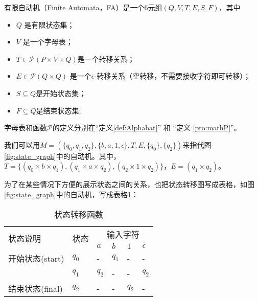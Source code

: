 \begin{definition}
    有限自动机（Finite Automata，FA）是一个6元组$(Q,V,T,E,S,F)$，其中
    \begin{itemize}
        \item $Q$ 是有限状态集；
        \item $V$ 是一个字母表；
        \item $ T \in \mathcal{P}(P\times V \times Q) $是一个转移关系；
        \item $ E \in \mathcal{P}(Q\times Q)$ 是一个$\epsilon$-转移关系（空转移，不需要接收字符即可转移）；
        \item $ S \subseteq Q $是开始状态集；
        \item $ F \subseteq Q $是结束状态集;
    \end{itemize}
    字母表和函数$\mathcal{P}$的定义分别在“定义\ref{def:Alphabat}” 和 “定义 \ref{pro:mathP}”。
\end{definition}

\begin{example}
    我们可以用$M=(\{q_0,q_1,q_2\},\{b,a,1,\epsilon\},T,E,\{q_0\},\{q_2\})$来指代图\ref{fig:state_graph}中的自动机。其中，$T=\{(q_0 \times b \times q_1),(q_1\times a \times q_2),(q_2\times 1 \times q_2)\}$，$E=(q_1 \times q_2)$。
\end{example}

\begin{remark}
    为了在某些情况下方便的展示状态之间的关系，也把状态转移图写成表格\cite{book1}，如图\ref{fig:state_graph}中的自动机，写成表格\ref{tab:sample}：
\begin{table}[!htbp]
    \caption{状态转移函数}
    \label{tab:sample}
    \centering
    \small%
    \setlength{\tabcolsep}{4pt}%
    \renewcommand{\arraystretch}{1.2}%
    \begin{tabular}{l p{4em}<{\centering} p{1em}<{\centering} p{1em}<{\centering} p{1em}<{\centering} p{1em}<{\centering}} 
        \toprule%
        \multirow{2}{*}{状态说明} & \multirow{2}{*}{状态} & \multicolumn{4}{c}{输入字符} \\
		\cline{3-6}      &    &$a$ & $b$ & $1$ & $\epsilon$ \\
        \midrule%
        开始状态(start)  & $q_0$ & -     & $q_1$  &      - &     -    \\
                        & $q_1$ & $q_2$ &    -   &    -   &    $q_2$ \\
        结束状态(final) & $q_2$ &   -   & -      & $q_2$  &    -     \\
        \bottomrule%
    \end{tabular}
\end{table}
\end{remark}


